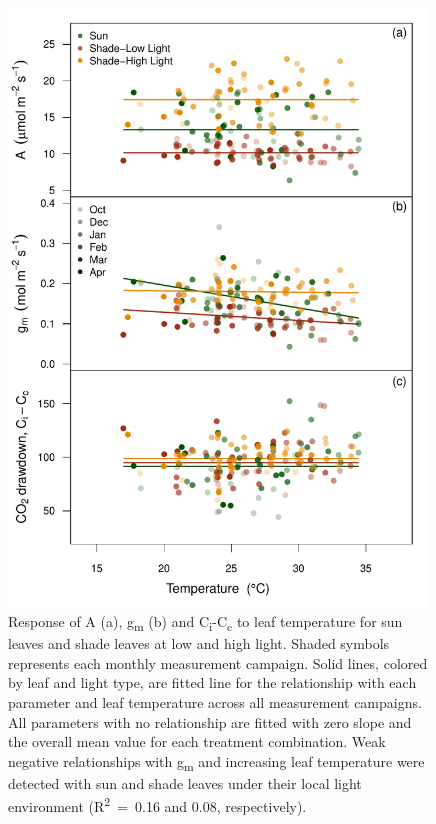 \documentclass[a4paper]{article}\usepackage[]{graphicx}\usepackage[]{color}
\begin{document}
\begin{figure}[h!]
    \centering
    \includegraphics[width=0.99\textwidth]{gasex_temp3.pdf}
    \caption{Response of A (a), g\textsubscript{m} (b) and C\textsubscript{i}-C\textsubscript{c} to leaf temperature for sun leaves and shade leaves at low and high light. Shaded symbols represents each monthly measurement campaign. Solid lines, colored by leaf and light type, are fitted line for the relationship with each parameter and leaf temperature across all measurement campaigns. All parameters with no relationship are fitted with zero slope and the overall mean value for each treatment combination. Weak negative relationships with g\textsubscript{m} and increasing leaf temperature were detected with sun and shade leaves under their local light environment (R\textsuperscript{2}~=~0.16 and 0.08, respectively). }
    \label{fig:figure 3.S3}
\end{figure}
\end{document}
